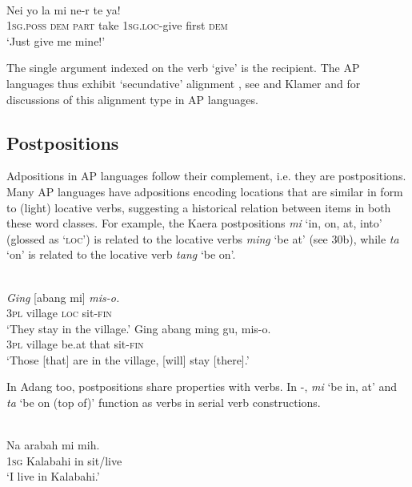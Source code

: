 \ea%
\label{ex:1:29}
   \\
\gll Nei  yo  la  mi  ne-r  te  ya! \\
\textsc{1sg.poss}  \textsc{dem}  \textsc{part} take  1\textsc{sg.loc}{}-give  first  \textsc{dem}    \\
\glt `Just give me mine!' 
\z
 
The single argument indexed on the verb `give' is the recipient. The AP languages thus exhibit `secundative' alignment \citep{Dryer1986}, see \citet{Klamer2010ditransitive} and Klamer and \citet{Schapper2012} for discussions of this alignment type in AP languages.

\subsection{Postpositions}\label{sec:1:5.6}
Adpositions in AP languages follow their complement, i.e. they are postpositions. Many AP languages have adpositions encoding locations that are similar in form to (light) locative verbs, suggesting a historical relation between items in both these word classes. For example, the Kaera postpositions \textit{mi} `in, on, at, into' (glossed as `\textsc{loc')}  is related to the locative verbs \textit{ming} `be at' (see 30b), while \textit{ta} `on' is related to the locative verb \textit{tang} `be on'. 



\ea%
\label{ex:1:30}
\ea
{}\\
\gll \textit{Ging} [abang  mi]  \textit{mis-o.}  \\
  \textsc{3pl} village  \textsc{loc} sit-\textsc{fin}  \\
\glt `They stay in the village.' 
\ex
\gll Ging  abang   ming  gu,   mis-o. \\
\textsc{3pl} village  be.at  that  sit-\textsc{fin}   \\
\glt `Those [that] are in the village, [will] stay [there].'
\z\z
 
 


In Adang too, postpositions share properties with verbs. In -, \textit{mi} `be in, at' and \textit{ta} `be on (top of)' function as verbs in serial verb constructions. 



\ea%
\label{ex:1:31}
\\
\gll Na  {\textglotstop}arabah  mi  mih. \\
\textsc{1sg} Kalabahi  in   sit/live      \\
\glt `I live in Kalabahi.' 
\z
 

